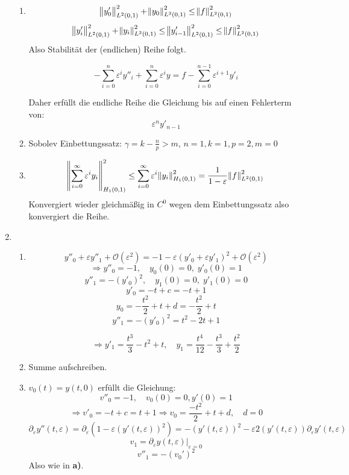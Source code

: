 \documentclass[a4paper,11pt]{scrartcl}
\newcommand*{\eps}{\varepsilon}
\newcommand*{\sm}{\sum_{i=0}^\infty}
\newcommand*{\sn}{\sum_{i=0}^n}
\newcommand*{\nL}[1]{\norm{#1}^2_{L^2(0,1)}}
\newcommand*{\nH}[1]{\norm{#1}^2_{H_1(0,1)}}
\newcommand*{\Ld}{\mathcal{O}}
\begin{document}
\begin{enumerate}[label*=\textbf{7.\arabic*.}]
\begin{enumerate}
    \item
      \[ \nL{y_0'} + \nL{y_0} \leq \nL{f}\]
      \[ \nL{y_i'} + \nL{y_i} \leq \nL{y'_{i-1}} \leq \nL{f}\]
      Also Stabilität der (endlichen) Reihe folgt.

      \[-\sn \eps^i y''_i + \sn \eps^i y = f - \sum_{i=0}^{n-1} \eps^{i+1} y'_i \]

      Daher erfüllt die endliche Reihe die Gleichung bis auf einen Fehlerterm
      von:
      \[\eps^{n} y'_{n-1}\]

    \item
      Sobolev Einbettungssatz: $\gamma = k - \frac{n}{p} > m$, $n=1, k=1, p=2, m=0$

    \item
      \[\nH{\sm \eps^i y_i} \leq \sm \eps^i \nH{y_i} = \frac{1}{1 - \eps} \nL{f}\]
      Konvergiert wieder gleichmäßig in $C^0$ wegen dem Einbettungssatz also konvergiert die Reihe.

  \end{enumerate}

  \item
  \begin{enumerate}
    \item
      \[y''_0 + \eps y''_1 + \Ld(\eps^2) = -1 - \eps (y'_0 + \eps y'_1)^2 + \Ld(\eps^2)\]
      \[\Rightarrow y''_0 = -1, \quad y_0(0) = 0, \; y'_0(0)=1 \]
      \[y''_1 = -(y'_0)^2, \quad y_1(0) = 0, \; y'_1(0)=0\]
      \[y'_0 = -t + c = -t + 1\]
      \[y_0 = -\frac{t^2}{2}+ t + d = -\frac{t^2}{2} + t\]
      \[y''_1 = -(y'_0)^2 = t^2 - 2t + 1\]

      \[\Rightarrow y'_1 = \frac{t^3}{3} - t^2 + t, \quad y_1 = \frac{t^4}{12} - \frac{t^3}{3} + \frac{t^2}{2}\]

    \item
      Summe aufschreiben.

    \item
      $v_0(t) = y(t, 0)$ erfüllt die Gleichung:
      \[v''_0 = -1, \quad v_0(0) = 0, y'(0) = 1 \]
      \[\Rightarrow v'_0 = -t + c = t+1 \Rightarrow v_0 = \frac{-t^2}{2} + t +
        d, \quad d=0\]
      \[\partial_\eps y''(t,\eps) = \partial_\eps(1 - \eps(y'(t,\eps))^2) =
        -(y'(t, \eps))^2 - \eps 2 (y'(t, \eps)) \partial_\eps y'(t, \eps) \]
      \[v_1 = \partial_\eps y(t, \eps) |_{\eps = 0}\]
      \[v''_1 = -(v_0')^2\]
      Also wie in \textbf{a)}.

  \end{enumerate}
\end{enumerate}
\end{document}
